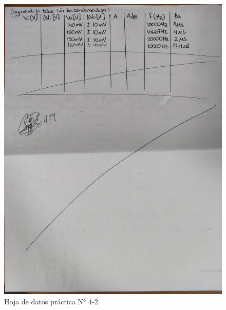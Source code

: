 \begin{figure}[ht]
    \centering
    \includegraphics[width=1.0\textwidth]{src/images/p4/p4-hoja-de-datos-2.jpg}
    \caption{Hoja de datos práctica N° 4-2}
    \label{fig:hoja-de-datos-p4-2}
\end{figure}

